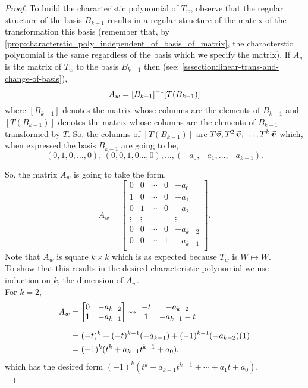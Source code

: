 \documentclass[../MathsNotesBase.tex]{subfiles}
\begin{document}
{\begin{proof}
			To build the characteristic polynomial of $T_w$, observe that the regular structure of the basis $B_{k-1}$ results in a regular structure of the matrix of the transformation \wrt this basis (remember that, by \autoref{prop:characterstic_poly_independent_of_basis_of_matrix}, the characterstic polynomial is the same regardless of the basis \wrt which we specify the matrix). If $A_w$ is the matrix of $T_w$ \wrt to the basis $B_{k-1}$ then (see: \ref{sssection:linear-trans-and-change-of-basis}),
			\[ A_w = {[B_{k-1}]}^{-1} [T(B_{k-1})] \]
			where $[B_{k-1}]$ denotes the matrix whose columns are the elements of $B_{k-1}$ and $[T(B_{k-1})]$ denotes the matrix whose columns are the elements of $B_{k-1}$ transformed by $T$. So, the columns of $[T(B_{k-1})]$ are ${ T\vec{\bm{v}}, T^2\,\vec{\bm{v}}, \dots, T^k\,\vec{\bm{v}} }$ which, when expressed \wrt the basis $B_{k-1}$ are going to be,
			\[ (0,1,0,\dots,0), \, (0,0,1,0\dots,0), \dots, (-a_0, -a_1, \dots, -a_{k-1}). \]
			
			So, the matrix $A_w$ is going to take the form,
			\[ A_w = 	\begin{bmatrix}
							0 & 0 & \cdots & 0 & -a_0 \\
							1 & 0 & \cdots & 0 & -a_1 \\
							0 & 1 & \cdots & 0 & -a_2 \\
							\vdots & \vdots & &  & \vdots \\
							0 & 0 & \cdots & 0 & -a_{k-2} \\
							0 & 0 & \cdots & 1 & -a_{k-1} \\
						\end{bmatrix}.
			\]
			Note that $A_w$ is square ${ k \times k }$ which is as expected because $T_w$ is ${ W \longmapsto W }$.\\
			
			To show that this results in the desired characteristic polynomial we use induction on $k$, the dimension of $A_w$.\\
			
			For ${ k = 2 }$,
			\[\begin{aligned}
				A_w &= 	\begin{bmatrix}
							0 & -a_{k-2} \\
							1 & -a_{k-1}
						\end{bmatrix} \leadsto
						\begin{vmatrix}
							-t & -a_{k-2} \\
							1 & -a_{k-1} - t
						\end{vmatrix} \nn
				&= (-t)^k + (-t)^{k-1} (-a_{k-1}) + (-1)^{k-1} (-a_{k-2}) (1) \\
				&= (-1)^k (t^k + a_{k-1} t^{k-1} + a_0).
			\end{aligned}\]
			which has the desired form ${ (-1)^k (t^k + a_{k-1} t^{k-1} + \cdots + a_1 t + a_0) }$.\\
			

\end{proof}}
\end{document}
